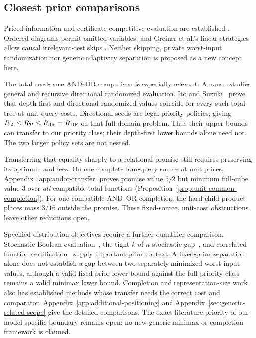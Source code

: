 \documentclass[pdflatex,sn-mathphys-num]{sn-jnl}
\theoremstyle{thmstyleone}
\theoremstyle{thmstylethree}
\theoremstyle{thmstyletwo}
\begin{document}
\subsection{Closest prior comparisons}
Priced information and certificate-competitive evaluation are established
\cite{charikar02,cicalese14}. Ordered diagrams permit omitted variables,
and Greiner et al.'s linear strategies allow causal irrelevant-test skips
\cite{greiner}. Neither skipping, private worst-input randomization nor
generic adaptivity separation is proposed as a new concept here.

The total read-once AND--OR comparison is especially relevant.
Amano~\cite{amano2011directional} studies general and recursive directional
randomized evaluation. Ito and Suzuki~\cite{itosuzuki2025collapse} prove
that depth-first and directional randomized values coincide for every
such total tree at unit query costs. Directional seeds are legal priority
policies, giving $R_{\mathcal A}\le R_{\mathcal P}\le R_{\rm dir}=R_{\rm DF}$
on that full-domain problem. Thus their upper bounds can transfer to our
priority class; their depth-first lower bounds alone need not.
The two larger policy sets are not nested.

Transferring that equality sharply to a relational promise still requires
preserving its optimum and fees. On one complete four-query source at unit
prices, Appendix~\ref{app:andor-transfer} proves promise value $5/2$ but
minimum full-cube value $3$ over \emph{all} compatible total functions
(Proposition~\ref{prop:unit-common-completion}). For one compatible AND--OR
completion, the hard-child product places mass $3/16$ outside the promise.
These fixed-source, unit-cost obstructions leave other reductions open.

Specified-distribution objectives require a further quantifier comparison.
Stochastic Boolean evaluation~\cite{hellerstein2022adaptivity}, the tight
$k$-of-$n$ stochastic gap~\cite{nielsen2025kofn}, and correlated function
certification~\cite{ghuge2026correlations} supply important prior context.
A fixed-prior separation alone does not establish a gap between two
separately minimized worst-input values, although a valid fixed-prior
lower bound against the full priority class remains a valid minimax
lower bound. Completion and representation-size work also has established
methods whose transfer needs the correct cost and comparator.
Appendix~\ref{app:additional-positioning} and
Appendix~\ref{sec:generic-related-scope} give the detailed comparisons.
The exact literature priority of our model-specific boundary remains open;
no new generic minimax or completion framework is claimed.
\end{document}
